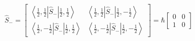 $\hat{S}_{-}=\left[\begin{array}{lll}
	\left\langle\frac{1}{2}, \frac{1}{2}\left|\hat{S}_{-}\right| \frac{1}{2}, \frac{1}{2}\right\rangle & \left\langle\frac{1}{2}, \frac{1}{2}\left|\hat{S}_{-}\right| \frac{1}{2},-\frac{1}{2}\right\rangle \\
	\left\langle\frac{1}{2},-\frac{1}{2}\left|\hat{S}_{-}\right| \frac{1}{2}, \frac{1}{2}\right\rangle & \left\langle\frac{1}{2},-\frac{1}{2}\left|\hat{S}_{-}\right| \frac{1}{2},-\frac{1}{2}\right\rangle
\end{array}\right]=\hbar\left[\begin{array}{ll}
	0 & 0 \\
	1 & 0
\end{array}\right]$\\\\

